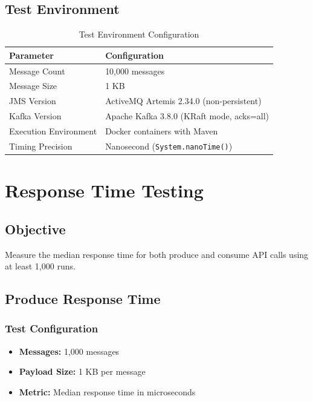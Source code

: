 \documentclass[11pt,a4paper]{article}
\begin{document}
\subsection{Test Environment}
\begin{table}[H]
\centering
\begin{tabular}{ll}
\toprule
\textbf{Parameter} & \textbf{Configuration} \\
\midrule
Message Count & 10,000 messages \\
Message Size & 1 KB \\
JMS Version & ActiveMQ Artemis 2.34.0 (non-persistent) \\
Kafka Version & Apache Kafka 3.8.0 (KRaft mode, acks=all) \\
Execution Environment & Docker containers with Maven \\
Timing Precision & Nanosecond (\texttt{System.nanoTime()}) \\
\bottomrule
\end{tabular}
\caption{Test Environment Configuration}
\end{table}

\newpage
\section{Response Time Testing}

\subsection{Objective}
Measure the median response time for both produce and consume API calls using at
least 1,000 runs.

\subsection{Produce Response Time}

\subsubsection{Test Configuration}
\begin{itemize}
    \item \textbf{Messages:} 1,000 messages
    \item \textbf{Payload Size:} 1 KB per message
    \item \textbf{Metric:} Median response time in microseconds
\end{itemize}
\end{document}
